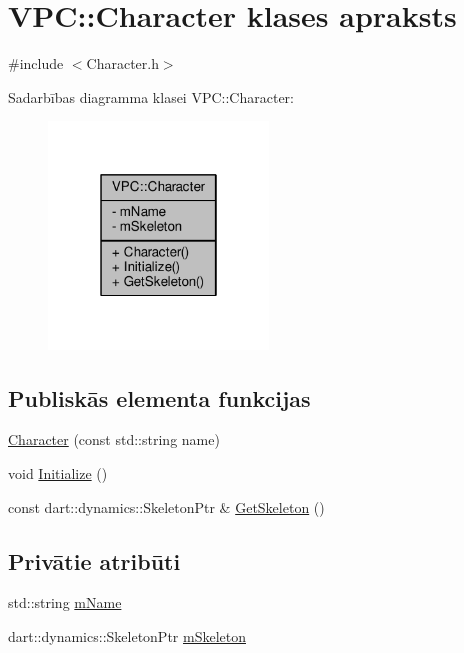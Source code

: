 \hypertarget{class_v_p_c_1_1_character}{}\section{V\+PC\+:\+:Character klases apraksts}
\label{class_v_p_c_1_1_character}


{\ttfamily \#include $<$Character.\+h$>$}



Sadarbības diagramma klasei V\+PC\+:\+:Character\+:
\nopagebreak
\begin{figure}[H]
\begin{center}
\leavevmode
\includegraphics[width=166pt]{class_v_p_c_1_1_character__coll__graph}
\end{center}
\end{figure}
\subsection*{Publiskās elementa funkcijas}
\begin{DoxyCompactItemize}
\item 
\hyperlink{class_v_p_c_1_1_character_ab07d09bda7da4df08877ba8a82aed689}{Character} (const std\+::string name)
\item 
void \hyperlink{class_v_p_c_1_1_character_a9fb1410736359fab3877e3afe18f2877}{Initialize} ()
\item 
const dart\+::dynamics\+::\+Skeleton\+Ptr \& \hyperlink{class_v_p_c_1_1_character_ab2694f013d033805504228cb151a368f}{Get\+Skeleton} ()
\end{DoxyCompactItemize}
\subsection*{Privātie atribūti}
\begin{DoxyCompactItemize}
\item 
std\+::string \hyperlink{class_v_p_c_1_1_character_a66b5e53cb1779993ae7b78e1b29209b5}{m\+Name}
\item 
dart\+::dynamics\+::\+Skeleton\+Ptr \hyperlink{class_v_p_c_1_1_character_afbd0d7d0c6227cabd47de1a5c2d7c039}{m\+Skeleton}
\end{DoxyCompactItemize}



